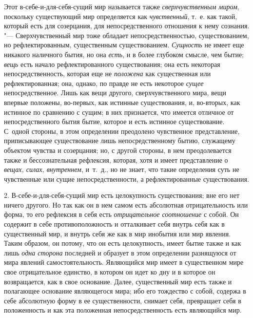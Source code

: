 Этот в-себе-и-для-себя-сущий мир называется также
{\em сверхчувственным миром}, поскольку существующий
мир определяется как {\em чувственный}, т.~е. как
такой, который есть для созерцания, для непосредственного отношения к нему
сознания. "--- Сверхчувственный мир тоже обладает непосредственностью,
существованием, но рефлектированным, существенным существованием.
{\em Сущность} не имеет еще никакого наличного бытия,
но она {\em есть}, и в более глубоком смысле, чем
бытие; {\em вещь} есть начало рефлектированного
существования; она есть некоторая непосредственность, которая еще не
{\em положена} как существенная или рефлектированная;
она, однако, по правде не есть некоторое {\em сущее}
непосредственное. Лишь как вещи другого, сверхчувственного мира, вещи
впервые положены, во-первых, как истинные существования, и, во-вторых, как
истинное по сравнению с сущим; в них признается, что имеется отличное от
непосредственного бытия бытие, которое и есть истинное существование.
С~одной стороны, в этом определении преодолено чувственное представление,
приписывающее существование лишь непосредственному бытию, служащему
объектом чувства и созерцания; но, с другой стороны, в нем преодолевается
также и бессознательная рефлексия, которая, хотя и имеет представление о
{\em вещах, силах, внутреннем}, и~т.~д., но не знает,
что такие определения суть не чувственные или сущие непосредственности, а
рефлектированные существования.

2. В-себе-и-для-себя-сущий мир есть целокупность существования; вне его нет
ничего другого. Но так как он в нем самом есть абсолютная отрицательность
или форма, то его рефлексия в себя есть
{\em отрицательное соотношение} с собой. Он содержит в
себе противоположность и отталкивает себя внутрь себя как в существенный
мир, и внутрь себя же как в мир инобытия или мир явления. Таким образом, он
потому, что он есть целокупность, имеет бытие также и как лишь
{\em одна сторона} последней и образует в этом
определении разнящуюся от мира явлений самостоятельность. Являющийся мир
имеет в существенном мире свое отрицательное единство, в котором он идет ко
дну и в которое он возвращается, как в свое основание. Далее, существенный
мир есть также и полагающее основание являющегося мира; ибо его тождество с
собой, содержа в себе абсолютную форму в ее существенности, снимает себя,
превращает себя в положенность и как эта положенная непосредственность есть
являющийся мир.

